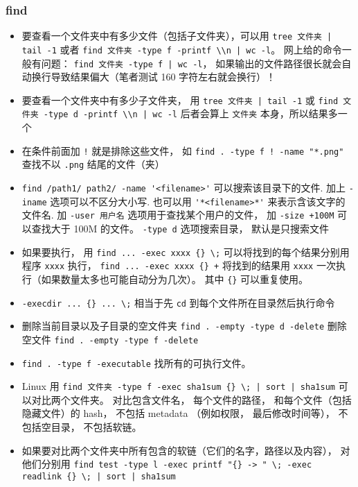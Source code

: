 \subsubsection{find}
\begin{itemize}
\item 要查看一个文件夹中有多少文件（包括子文件夹），可以用 \verb`tree 文件夹 | tail -1` 或者 \verb`find 文件夹 -type f -printf \\n | wc -l`。 网上给的命令一般有问题： \verb`find 文件夹 -type f | wc -l`， 如果输出的文件路径很长就会自动换行导致结果偏大（笔者测试 160 字符左右就会换行）！
\item 要查看一个文件夹中有多少子文件夹， 用 \verb`tree 文件夹 | tail -1` 或 \verb`find 文件夹 -type d -printf \\n | wc -l` 后者会算上 \verb`文件夹` 本身，所以结果多一个
\item 在条件前面加 \verb`!` 就是排除这些文件， 如 \verb`find . -type f ! -name "*.png"` 查找不以 \verb`.png` 结尾的文件（夹）
\item \verb`find /path1/ path2/ -name '<filename>'` 可以搜索该目录下的文件. 加上 \verb`-iname` 选项可以不区分大小写. 也可以用 \verb`'*<filename>*'` 来表示含该文字的文件名. 加 \verb`-user 用户名` 选项用于查找某个用户的文件， 加 \verb`-size +100M` 可以查找大于 100M 的文件。 \verb`-type d` 选项搜索目录， 默认是只搜索文件
\item 如果要执行， 用 \verb`find ... -exec xxxx {} \;` 可以将找到的每个结果分别用程序 \verb`xxxx` 执行， \verb`find ... -exec xxxx {} +` 将找到的结果用 \verb`xxxx` 一次执行（如果数量太多也可能自动分为几次）。 其中 \verb`{}` 可以重复使用。
\item \verb`-execdir ... {} ... \;` 相当于先 \verb`cd` 到每个文件所在目录然后执行命令
\item 删除当前目录以及子目录的空文件夹 \verb`find . -empty -type d -delete` 删除空文件 \verb`find . -empty -type f -delete`
\item \verb`find . -type f -executable` 找所有的可执行文件。
\item Linux 用 \verb`find 文件夹 -type f -exec sha1sum {} \; | sort | sha1sum` 可以对比两个文件夹。 对比包含文件名， 每个文件的路径， 和每个文件（包括隐藏文件）的 hash， 不包括 metadata （例如权限， 最后修改时间等）， 不包括空目录， 不包括软链。
\item 如果要对比两个文件夹中所有包含的软链（它们的名字，路径以及内容）， 对他们分别用 \verb`find test -type l -exec printf "{} -> " \; -exec readlink {} \; | sort | sha1sum`
\end{itemize}

